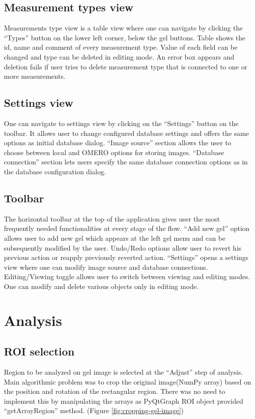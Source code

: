 \subsection{Measurement types view}
Measurements type view is a table view where one can navigate by clicking the “Types” button on the lower left corner, below the gel buttons. Table shows the id, name and comment of every measurement type. Value of each field can be changed and type can be deleted in editing mode. An error box appears and deletion fails if user tries to delete measurement type that is connected to one or more measurements.

\subsection{Settings view}
One can navigate to settings view by clicking on the “Settings” button on the toolbar. It allows user to change configured database settings and offers the same options as initial database dialog. “Image source” section allows the user to choose between local and OMERO options for storing images. “Database connection” section lets users specify the same database connection options as in the database configuration dialog.

\subsection{Toolbar}
The horizontal toolbar at the top of the application gives user the most frequently needed functionalities at every stage of the flow. “Add new gel” option allows user to add new gel which appears at the left gel menu and can be subsequently modified by the user. Undo/Redo options allow user to revert his previous action or reapply previously reverted action. “Settings” opens a settings view where one can modify image source and database connections. Editing/Viewing toggle allows user to switch between viewing and editing modes. One can modify and delete various objects only in editing mode.

\section{Analysis}

\subsection{ROI selection}
Region to be analyzed on gel image is selected at the “Adjust” step of analysis. Main algorithmic problem was to crop the original image(NumPy array) based on the position and rotation of the rectangular region. There was no need to implement this by manipulating the arrays as PyQtGraph ROI object provided “getArrayRegion” method. (Figure \ref{fig:cropping-gel-image})

